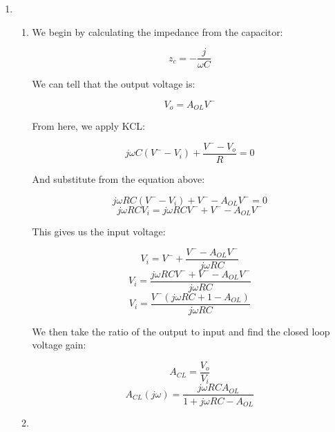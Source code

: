 \begin{enumerate}
\begin{enumerate}
        $$v_o-25(I_s-I)-10^{11}I=0$$
        $$v_o=25I_s-10^{11}I$$
        $$v_o=9.975\cdot10^{10}I$$

        Therefore, we may say that:

        $$\boxed{\frac{v_o}{V_s}\approx -10001}$$

        We can tell that the finite gain is approximately one-tenth of the ideal op-amp gain.

      \item 

        To find the impedance, we can use our equations from part (a) to write:

        $$Z_{in}=\frac{}$$

      \item 

    \end{enumerate}

  \item

    \begin{enumerate}

      \item 

        We begin by calculating the impedance from the capacitor:

        $$z_c=-\frac{j}{\omega C}$$

        We can tell that the output voltage is:

        $$V_o=A_{OL}V^{-}$$

        From here, we apply KCL:

        $$j\omega C(V^{-}-V_i)+\frac{V^{-}-V_o}{R}=0$$

        And substitute from the equation above:

        $$j\omega RC(V^{-}-V_i)+V^{-}-A_{OL}V^{-}=0$$
        $$j\omega RCV_i=j\omega RCV^{-}+V^{-}-A_{OL}V^{-}$$

        This gives us the input voltage:

        $$V_i=V^{-}+\frac{V^{-}-A_{OL}V^{-}}{j\omega RC}$$
        $$V_i=\frac{j\omega RCV^{-}+V^{-}-A_{OL}V^{-}}{j\omega RC}$$
        $$V_i=\frac{V^{-}(j\omega RC+1-A_{OL})}{j\omega RC}$$

        We then take the ratio of the output to input and find the closed loop voltage gain:

        $$A_{CL}=\frac{V_o}{V_i}$$
        $$\boxed{A_{CL}(j\omega)=\frac{j\omega RCA_{OL}}{1+j\omega RC-A_{OL}}}$$

      \item 


\end{enumerate}
\end{enumerate}
